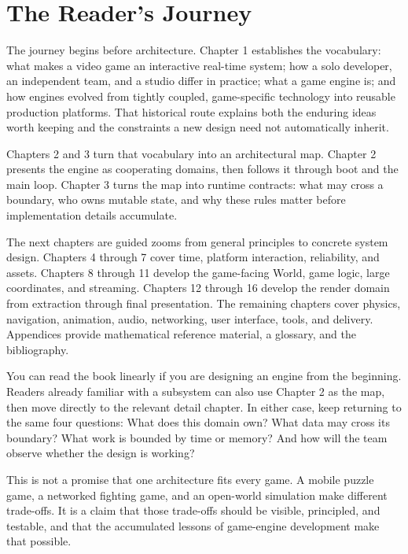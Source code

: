 \documentclass[
  11pt,
  letterpaper,
  DIV=11,
  numbers=noendperiod,
  twoside,
  open=right]{scrreprt}
\begin{document}
\section*{The Reader's Journey}\label{the-readers-journey}


The journey begins before architecture. Chapter 1 establishes the
vocabulary: what makes a video game an interactive real-time system; how
a solo developer, an independent team, and a studio differ in practice;
what a game engine is; and how engines evolved from tightly coupled,
game-specific technology into reusable production platforms. That
historical route explains both the enduring ideas worth keeping and the
constraints a new design need not automatically inherit.

Chapters 2 and 3 turn that vocabulary into an architectural map. Chapter
2 presents the engine as cooperating domains, then follows it through
boot and the main loop. Chapter 3 turns the map into runtime contracts:
what may cross a boundary, who owns mutable state, and why these rules
matter before implementation details accumulate.

The next chapters are guided zooms from general principles to concrete
system design. Chapters 4 through 7 cover time, platform interaction,
reliability, and assets. Chapters 8 through 11 develop the game-facing
World, game logic, large coordinates, and streaming. Chapters 12 through
16 develop the render domain from extraction through final presentation.
The remaining chapters cover physics, navigation, animation, audio,
networking, user interface, tools, and delivery. Appendices provide
mathematical reference material, a glossary, and the bibliography.

You can read the book linearly if you are designing an engine from the
beginning. Readers already familiar with a subsystem can also use
Chapter 2 as the map, then move directly to the relevant detail chapter.
In either case, keep returning to the same four questions: What does
this domain own? What data may cross its boundary? What work is bounded
by time or memory? And how will the team observe whether the design is
working?

This is not a promise that one architecture fits every game. A mobile
puzzle game, a networked fighting game, and an open-world simulation
make different trade-offs. It is a claim that those trade-offs should be
visible, principled, and testable, and that the accumulated lessons of
game-engine development make that possible.
\end{document}
